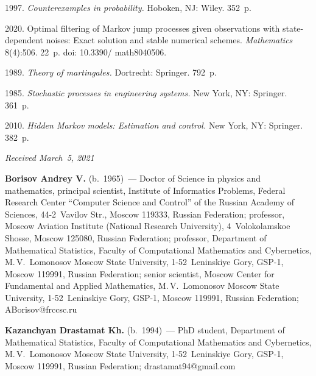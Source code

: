\begin{multicols}{2}
{{\begin{thebibliography}{99}
  1997. \textit{Counterexamples in probability.} Hoboken, NJ: Wiley. 352~p.


  2020. Optimal filtering of Markov jump processes given observations with state-dependent noises: 
  Exact solution and stable numerical schemes. \textit{Mathematics} 8(4):506. 22~p. doi: 10.3390/ math8040506.
 
  1989. \textit{Theory of martingales.}  Dortrecht: Springer. 792~p.
 
 
  1985. \textit{Stochastic processes in engineering systems.} New York, NY:
 Springer. 361~p.

  2010. 
 \textit{Hidden Markov models: Estimation and control.} New York, NY: Springer. 382~p.
\end{thebibliography}

 }
 }

\end{multicols}

\vspace*{-3pt}

  \hfill{\small\textit{Received March~5, 2021}}






\Contr

\noindent
\textbf{Borisov Andrey V.} (b.\ 1965)~--- 
Doctor of Science in physics and mathematics, principal scientist, Institute of Informatics Problems, 
Federal Research Center ``Computer Science and Control'' of the Russian Academy of Sciences, 
44-2~Vavilov Str., Moscow 119333, Russian Federation; professor, Moscow Aviation 
Institute (National Research University), 4~Volokolamskoe Shosse, Moscow 125080, Russian Federation; 
professor, Department of Mathematical Statistics, Faculty of Computational Mathematics and Cybernetics,
M.\,V.~Lomonosov Moscow State University, 1-52~Leninskiye Gory, GSP-1, Moscow 119991, Russian Federation; 
senior scientist, Moscow Center for Fundamental and Applied Mathematics, 
M.\,V.~Lomonosov Moscow State University, 1-52~Leninskiye Gory, GSP-1, Moscow 119991, Russian Federation; 
\mbox{ABorisov@frccsc.ru}

\vspace*{3pt}

\noindent
\textbf{Kazanchyan Drastamat Kh.} (b.\ 1994)~--- 
PhD student, Department of Mathematical Statistics, Faculty of Computational Mathematics and Cybernetics, 
M.\,V.~Lomonosov Moscow State University, 1-52~Leninskiye Gory, GSP-1, Moscow 119991, Russian Federation; 
\mbox{drastamat94@gmail.com} 


\label{end\stat}

\renewcommand{\bibname}{\protect\rm Литература}